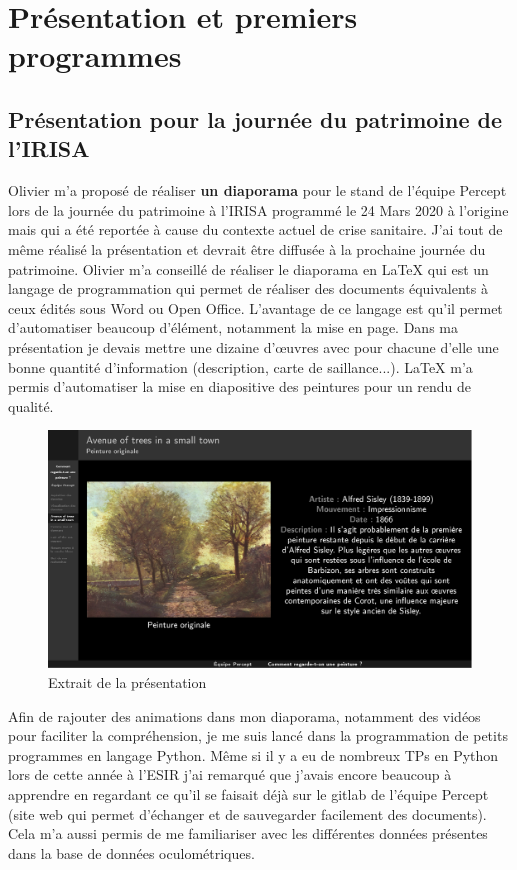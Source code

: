 \chapter{Présentation et premiers programmes}

\section{Présentation pour la journée du patrimoine de l'IRISA}

\par
Olivier m'a proposé de réaliser \textbf{un diaporama} pour le stand de l'équipe Percept lors de la journée du patrimoine à l'IRISA programmé le 24 Mars 2020 à l'origine mais qui a été reportée à cause du contexte actuel de crise sanitaire. J'ai tout de même réalisé la présentation et devrait être diffusée à la prochaine journée du patrimoine. Olivier m'a conseillé de réaliser le diaporama en \LaTeX{} qui est un langage de programmation qui permet de réaliser des documents équivalents à ceux édités sous Word ou Open Office. L'avantage de ce langage est qu'il permet d'automatiser beaucoup d'élément, notamment la mise en page. Dans ma présentation je devais mettre une dizaine d'\oe{}uvres avec pour chacune d'elle une bonne quantité d'information (description, carte de saillance...). \LaTeX{} m'a permis d'automatiser la mise en diapositive des peintures pour un rendu de qualité.

\begin{figure}[!ht]
    \centering
    \includegraphics[width=0.7\linewidth]{datas/exemple_diapo.png}
    \caption{Extrait de la présentation}
    \label{ex_diapo}
\end{figure}

\par
Afin de rajouter des animations dans mon diaporama, notamment des vidéos pour faciliter la compréhension, je me suis lancé dans la programmation de petits programmes en langage Python. Même si il y a eu de nombreux TPs en Python lors de cette année à l'ESIR j'ai remarqué que j'avais encore beaucoup à apprendre en regardant ce qu'il se faisait déjà sur le gitlab de l'équipe Percept (site web qui permet d'échanger et de sauvegarder facilement des documents). Cela m'a aussi permis de me familiariser avec les différentes données présentes dans la base de données oculométriques.

